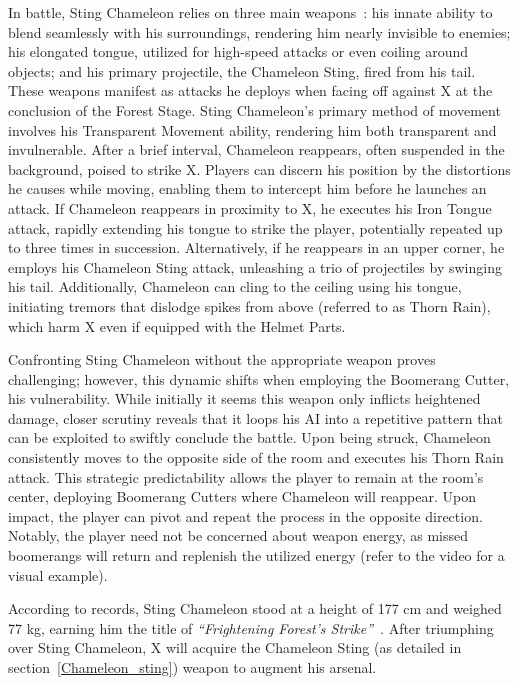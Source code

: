In battle, Sting Chameleon relies on three main weapons~\cite{wiki:Sting_chameleon}: his innate ability to blend seamlessly with his surroundings, rendering him nearly invisible to enemies; his elongated tongue, utilized for high-speed attacks or even coiling around objects; and his primary projectile, the Chameleon Sting, fired from his tail. These weapons manifest as attacks he deploys when facing off against X at the conclusion of the Forest Stage. Sting Chameleon's primary method of movement involves his Transparent Movement ability, rendering him both transparent and invulnerable. After a brief interval, Chameleon reappears, often suspended in the background, poised to strike X. Players can discern his position by the distortions he causes while moving, enabling them to intercept him before he launches an attack. If Chameleon reappears in proximity to X, he executes his Iron Tongue attack, rapidly extending his tongue to strike the player, potentially repeated up to three times in succession. Alternatively, if he reappears in an upper corner, he employs his Chameleon Sting attack, unleashing a trio of projectiles by swinging his tail. Additionally, Chameleon can cling to the ceiling using his tongue, initiating tremors that dislodge spikes from above (referred to as Thorn Rain), which harm X even if equipped with the Helmet Parts.

Confronting Sting Chameleon without the appropriate weapon proves challenging; however, this dynamic shifts when employing the Boomerang Cutter, his vulnerability. While initially it seems this weapon only inflicts heightened damage, closer scrutiny reveals that it loops his AI into a repetitive pattern that can be exploited to swiftly conclude the battle. Upon being struck, Chameleon consistently moves to the opposite side of the room and executes his Thorn Rain attack. This strategic predictability allows the player to remain at the room's center, deploying Boomerang Cutters where Chameleon will reappear. Upon impact, the player can pivot and repeat the process in the opposite direction. Notably, the player need not be concerned about weapon energy, as missed boomerangs will return and replenish the utilized energy (refer to the video  for a visual example).

According to records, Sting Chameleon stood at a height of 177 cm and weighed 77 kg, earning him the title of \textit{``Frightening Forest's Strike''}~\cite{book:MMX_Complete_art}. After triumphing over Sting Chameleon, X will acquire the Chameleon Sting (as detailed in section~\ref{Chameleon_sting}) weapon to augment his arsenal.


